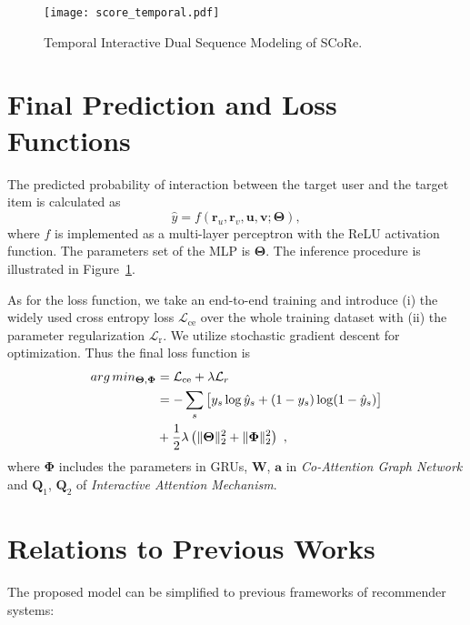 \begin{figure}[t]
	\centering
	\texttt{[image: score\_temporal.pdf]}
	\caption{Temporal Interactive Dual Sequence Modeling of SCoRe.}
	\label{fig:temporal-framework}
	\vspace{-10pt}
\end{figure}


\section{Final Prediction and Loss Functions}
The predicted probability of interaction between the target user and the target item is calculated as
\begin{equation}
\hat{y} = f(\bm{r}_u, \bm{r}_v, \bm{u}, \bm{v}; \bm{\Theta}),
\end{equation}
where $f$ is implemented as a multi-layer perceptron with the ReLU activation function. The parameters set of the MLP is $\bm{\Theta}$.
The inference procedure is illustrated in Figure~\ref{fig:temporal-framework}.

As for the loss function, we take an end-to-end training and introduce (i) the widely used cross entropy loss $\mathcal{L}_{\text{ce}}$ \cite{ren2018bid,zhou2018deepa,zhou2018deepb} over the whole training dataset with (ii) the parameter regularization $\mathcal{L}_{\text{r}}$. We utilize stochastic gradient descent for optimization. Thus the final loss function is
\begin{equation}
\begin{aligned}
arg\,min_{\bm{\Theta}, \bm{\Phi}} &= \mathcal{L}_{\text{ce}} + \lambda \mathcal{L}_r \\
&= -\sum_{s} \big[ y_s \log \hat{y}_s + (1-y_s) \log (1-\hat{y}_s)\big] \\
& + \frac{1}{2} \lambda \left( \|\bm{\Theta} \|_2^2 + \| \bm{\Phi} \|_2^2 \right) ~,
\end{aligned}
\end{equation}
where $\bm{\Phi}$ includes the parameters in GRUs, $\bm{W}$, $\bm{a}$ in \textit{Co-Attention Graph Network} and $\bm Q_1$, $\bm Q_2$ of \textit{Interactive Attention Mechanism}.

\section{Relations to Previous Works}
The proposed model can be simplified to previous frameworks of recommender systems:



